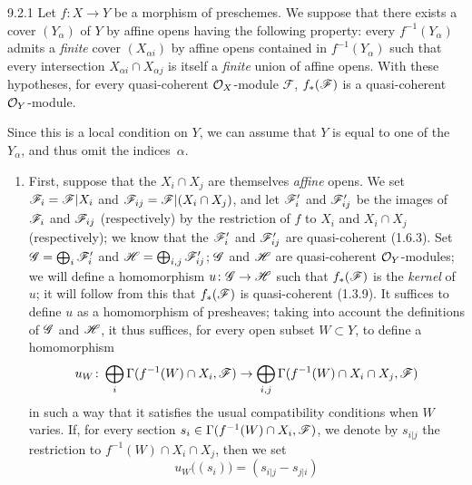 \documentclass[../main.tex]{subfiles}
\begin{document}
\begin{cx}[Proposition]{9.2.1}
    Let $f\colon X\to Y$ be a morphism of preschemes.
    We suppose that there exists a cover $(Y_\alpha)$ of $Y$ by affine opens having the following property: every $f^{-1}(Y_\alpha)$ admits a \emph{finite} cover $(X_{\alpha i})$ by affine opens contained in $f^{-1}(Y_\alpha)$ such that every intersection $X_{\alpha i}\cap X_{\alpha j}$ is itself a \emph{finite} union of affine opens.
    With these hypotheses, for every quasi-coherent $\mathcal{O}_X$-module $\mathscr{F}$, $f_*(\mathscr{F})$ is a quasi-coherent $\mathcal{O}_Y$-module.
\end{cx}

Since this is a local condition on $Y$, we can assume that $Y$ is equal to one of the $Y_\alpha$, and thus omit the indices~$\alpha$.

\begin{enumerate}[label=\alph*)]
    \item First, suppose that the $X_i\cap X_j$ are themselves \emph{affine} opens.
        We set $\mathscr{F}_i=\mathscr{F}|X_i$ and $\mathscr{F}_{ij}=\mathscr{F}|(X_i\cap X_j)$, and let $\mathscr{F}'_i$ and $\mathscr{F}'_{ij}$ be the images of $\mathscr{F}_i$ and $\mathscr{F}_{ij}$ (respectively) by the restriction of $f$ to $X_i$ and $X_i\cap X_j$ (respectively); we know that the $\mathscr{F}'_i$ and $\mathscr{F}'_{ij}$ are quasi-coherent (1.6.3).
        Set $\mathscr{G}=\bigoplus_i\mathscr{F}'_i$ and $\mathscr{H}=\bigoplus_{i,j}\mathscr{F}'_{ij}$; $\mathscr{G}$ and $\mathscr{H}$ are quasi-coherent $\mathcal{O}_Y$-modules; we will define a homomorphism $u\colon\mathscr{G}\to\mathscr{H}$ such that $f_*(\mathscr{F})$ is the \emph{kernel} of $u$; it will follow from this that $f_*(\mathscr{F})$ is quasi-coherent (1.3.9).
        It suffices to define $u$ as a homomorphism of presheaves; taking into account the definitions of $\mathscr{G}$ and $\mathscr{H}$, it thus suffices, for every open subset $W\subset Y$, to define a homomorphism
        \begin{equation*}
            u_W\colon \bigoplus_i\Gamma(f^{-1}(W)\cap X_i, \mathscr{F}) \to \bigoplus_{i,j}\Gamma(f^{-1}(W)\cap X_i\cap X_j, \mathscr{F})
        \end{equation*}
        in such a way that it satisfies the usual compatibility conditions when $W$ varies.
        If, for every section $s_i\in\Gamma(f^{-1}(W)\cap X_i, \mathscr{F})$, we denote by $s_{i|j}$ the restriction to $f^{-1}(W)\cap X_i\cap X_j$, then we set
        \begin{equation*}
            u_W\big((s_i)\big) = (s_{i|j}-s_{j|i})
        \end{equation*}

\end{enumerate}
\end{document}
